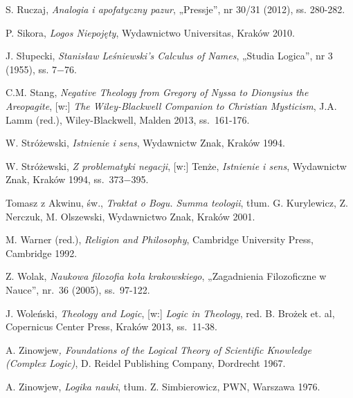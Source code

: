 \begin{thebibliography}{99}
\bibitem{} S. Ruczaj, \textit{Analogia i apofatyczny pazur}, „Pressje”, nr 30/31
(2012), ss. 280-282.

\bibitem{} P. Sikora, \textit{Logos Niepojęty}, Wydawnictwo Universitas, Kraków
2010.

\bibitem{} J. Słupecki, \textit{Stanisław Leśniewski’s Calculus of Names}, „Studia
Logica”, nr 3 (1955), ss. 7$-$76.

\bibitem{} C.M. Stang, \textit{Negative Theology from Gregory of Nyssa to Dionysius
the Areopagite}, [w:] \textit{The Wiley-Blackwell Companion to
Christian Mysticism}, J.A. Lamm (red.), Wiley-Blackwell, Malden 2013,
ss.~161-176.

\bibitem{} W. Stróżewski, \textit{Istnienie i sens}, Wydawnictw Znak, Kraków 1994.

\bibitem{} W. Stróżewski, \textit{Z problematyki negacji}, [w:] Tenże,
\textit{Istnienie i sens}, Wydawnictw Znak, Kraków 1994, ss.~373$-$395.

\bibitem{} Tomasz z Akwinu, św., \textit{Traktat o Bogu. Summa teologii}, tłum. G.
Kurylewicz, Z. Nerczuk, M. Olszewski, Wydawnictwo Znak, Kraków 2001.

\bibitem{} M. Warner (red.), \textit{Religion and Philosophy}, Cambridge University
Press, Cambridge 1992.

\bibitem{} Z. Wolak, \textit{Naukowa filozofia koła krakowskiego}, „Zagadnienia
Filozoficzne w Nauce”, nr.~36 (2005), ss.~97-122.

\bibitem{} J. Woleński, \textit{Theology and Logic}, [w:] \textit{Logic in
Theology}, red. B. Brożek et. al, Copernicus Center Press, Kraków 2013,
ss.~11-38.

\bibitem{} A. Zinowjew\textit{, Foundations of the Logical Theory of Scientific
Knowledge (Complex Logic)}, D. Reidel Publishing Company, Dordrecht
1967.

\bibitem{} A. Zinowjew, \textit{Logika nauki}, tłum. Z. Simbierowicz, PWN, Warszawa
1976.

\end{thebibliography}